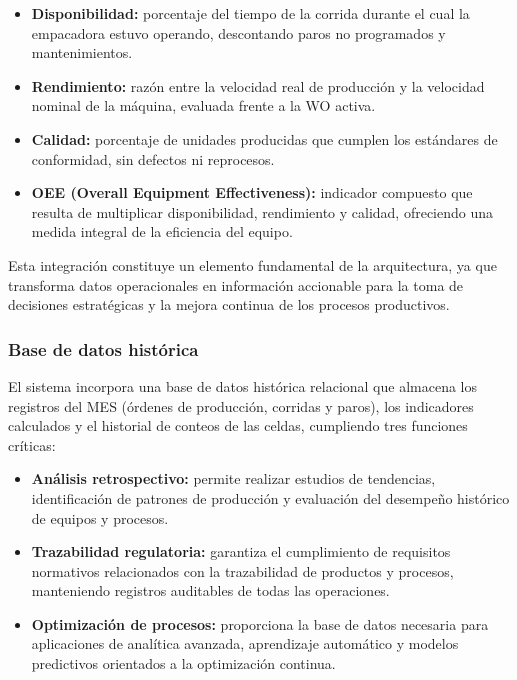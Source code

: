 \begin{itemize}
    \item \textbf{Disponibilidad:} porcentaje del tiempo de la corrida durante el cual la empacadora estuvo operando, descontando paros no programados y mantenimientos.
    \item \textbf{Rendimiento:} razón entre la velocidad real de producción y la velocidad nominal de la máquina, evaluada frente a la WO activa.
    \item \textbf{Calidad:} porcentaje de unidades producidas que cumplen los estándares de conformidad, sin defectos ni reprocesos.
    \item \textbf{OEE (Overall Equipment Effectiveness):} indicador compuesto que resulta de multiplicar disponibilidad, rendimiento y calidad, ofreciendo una medida integral de la eficiencia del equipo.
\end{itemize}

Esta integración constituye un elemento fundamental de la arquitectura, ya que transforma datos operacionales en información accionable para la toma de decisiones estratégicas y la mejora continua de los procesos productivos.

\subsubsection{Base de datos histórica}

El sistema incorpora una base de datos histórica relacional que almacena los registros del MES (órdenes de producción, corridas y paros), los indicadores calculados y el historial de conteos de las celdas, cumpliendo tres funciones críticas:

\begin{itemize}
    \item \textbf{Análisis retrospectivo:} permite realizar estudios de tendencias, identificación de patrones de producción y evaluación del desempeño histórico de equipos y procesos.
    \item \textbf{Trazabilidad regulatoria:} garantiza el cumplimiento de requisitos normativos relacionados con la trazabilidad de productos y procesos, manteniendo registros auditables de todas las operaciones.
    \item \textbf{Optimización de procesos:} proporciona la base de datos necesaria para aplicaciones de analítica avanzada, aprendizaje automático y modelos predictivos orientados a la optimización continua.
\end{itemize}

